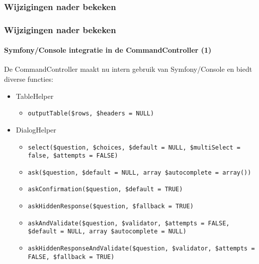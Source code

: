\begin{frame}[fragile]
	\frametitle{Wijzigingen nader bekeken}\frametitle{Wijzigingen nader bekeken}
	\framesubtitle{Symfony/Console integratie in de CommandController (1)}

	\lstset{basicstyle=\tiny\ttfamily}

	De CommandController maakt nu intern gebruik van Symfony/Console en biedt diverse functies:

	\begin{itemize}

		\item \smaller TableHelper
			\begin{itemize}
				\item\smaller\texttt{outputTable(\$rows, \$headers = NULL)}
			\end{itemize}

		\item DialogHelper
			\begin{itemize}
				\item\smaller\texttt{select(\$question, \$choices, \$default = NULL, \$multiSelect = false, \$attempts = FALSE)}
				\item\texttt{ask(\$question, \$default = NULL, array \$autocomplete = array())}
				\item\texttt{askConfirmation(\$question, \$default = TRUE)}
				\item\texttt{askHiddenResponse(\$question, \$fallback = TRUE)}
				\item\texttt{askAndValidate(\$question, \$validator, \$attempts = FALSE, \$default = NULL, array \$autocomplete = NULL)}
				\item\texttt{askHiddenResponseAndValidate(\$question, \$validator, \$attempts = FALSE, \$fallback = TRUE)}
			\end{itemize}

	\end{itemize}

\end{frame}



